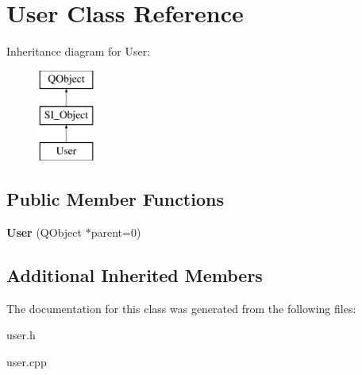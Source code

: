 \hypertarget{class_user}{}\section{User Class Reference}
\label{class_user}
Inheritance diagram for User\+:\begin{figure}[H]
\begin{center}
\leavevmode
\includegraphics[height=3.000000cm]{class_user}
\end{center}
\end{figure}
\subsection*{Public Member Functions}
\begin{DoxyCompactItemize}
\item 
\mbox{\label{class_user_aec8c695d31d05b72e1fe0fc186ca3e2f}} 
{\bfseries User} (Q\+Object $\ast$parent=0)
\end{DoxyCompactItemize}
\subsection*{Additional Inherited Members}


The documentation for this class was generated from the following files\+:\begin{DoxyCompactItemize}
\item 
user.\+h\item 
user.\+cpp\end{DoxyCompactItemize}
